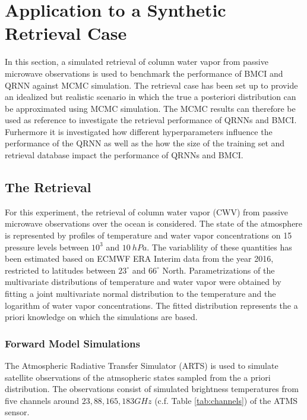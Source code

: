 \documentclass[journal abbreviation, manuscript]{copernicus}
\begin{document}
\section{Application to a Synthetic Retrieval Case}
\label{sec:synthetic}

In this section, a simulated retrieval of column water vapor from passive
microwave observations is used to benchmark the performance of BMCI and QRNN
against MCMC simulation. The retrieval case has been set up to provide an
idealized but realistic scenario in which the true a posteriori distribution can
be approximated using MCMC simulation. The MCMC results can therefore be used as
reference to investigate the retrieval performance of QRNNs and BMCI. Furhermore
it is investigated how different hyperparameters influence the performance of
the QRNN as well as the how the size of the training set and retrieval database
impact the performance of QRNNs and BMCI.

\subsection{The Retrieval}

   For this experiment, the retrieval of column water vapor (CWV) from passive
   microwave observations over the ocean is considered. The state of the
   atmosphere is represented by profiles of temperature and water vapor
   concentrations on 15 pressure levels between $10^3$ and $10\:\unit{hPa}$. The
   variablility of these quantities has been estimated based on ECMWF ERA
   Interim data \citep{era_interim} from the year 2016, restricted to latitudes
   between $23^\circ$ and $66^\circ$ North. Parametrizations of the multivariate
   distributions of temperature and water vapor were obtained by fitting a joint
   multivariate normal distribution to the temperature and the logarithm of
   water vapor concentrations. The fitted distribution represents the a priori
   knowledge on which the simulations are based.

\subsubsection{Forward Model Simulations}

   The Atmospheric Radiative Transfer Simulator (ARTS) \citep{arts} is used to
   simulate satellite observations of the atmsopheric states sampled from the a
   priori distribution. The observations consist of simulated brightness
   temperatures from five channels around $23, 88, 165, 183 \unit{GHz}$
   (c.f. Table \ref{tab:channels}) of the ATMS sensor.
\end{document}
